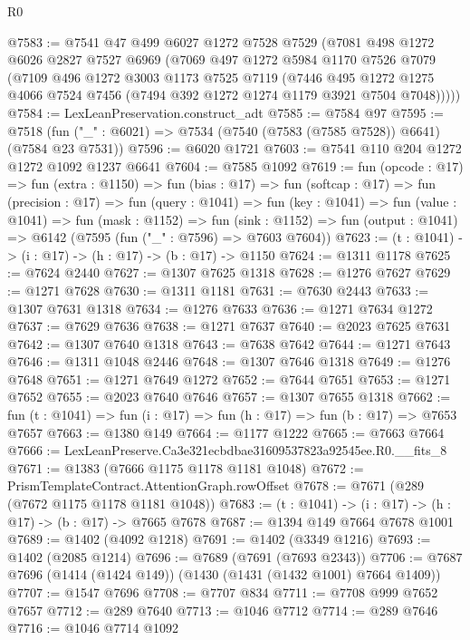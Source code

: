 \begin{lexlean}{R0}
\begin{coremodule}
@7583 := @7541
    @47
    @499
    @6027
    @1272
    @7528
    @7529
    (@7081
      @498
      @1272
      @6026
      @2827
      @7527
      @6969
      (@7069
        @497
        @1272
        @5984
        @1170
        @7526
        @7079
        (@7109
          @496
          @1272
          @3003
          @1173
          @7525
          @7119
          (@7446
            @495
            @1272
            @1275
            @4066
            @7524
            @7456
            (@7494 @392 @1272 @1274 @1179 @3921 @7504 @7048)))))
@7584 := LexLeanPreservation.construct_adt
@7585 := @7584 @97
@7595 := @7518 (fun ("_" : @6021) => @7534 (@7540 (@7583 (@7585 @7528)) @6641) (@7584 @23 @7531))
@7596 := @6020 @1721
@7603 := @7541 @110 @204 @1272 @1272 @1092 @1237 @6641
@7604 := @7585 @1092
@7619 := fun (opcode : @17) =>
  fun (extra : @1150) =>
  fun (bias : @17) =>
  fun (softcap : @17) =>
  fun (precision : @17) =>
  fun (query : @1041) =>
  fun (key : @1041) =>
  fun (value : @1041) =>
  fun (mask : @1152) =>
  fun (sink : @1152) => fun (output : @1041) => @6142 (@7595 (fun ("_" : @7596) => @7603 @7604))
@7623 := (t : @1041) -> (i : @17) -> (h : @17) -> (b : @17) -> @1150
@7624 := @1311 @1178
@7625 := @7624 @2440
@7627 := @1307 @7625 @1318
@7628 := @1276 @7627
@7629 := @1271 @7628
@7630 := @1311 @1181
@7631 := @7630 @2443
@7633 := @1307 @7631 @1318
@7634 := @1276 @7633
@7636 := @1271 @7634 @1272
@7637 := @7629 @7636
@7638 := @1271 @7637
@7640 := @2023 @7625 @7631
@7642 := @1307 @7640 @1318
@7643 := @7638 @7642
@7644 := @1271 @7643
@7646 := @1311 @1048 @2446
@7648 := @1307 @7646 @1318
@7649 := @1276 @7648
@7651 := @1271 @7649 @1272
@7652 := @7644 @7651
@7653 := @1271 @7652
@7655 := @2023 @7640 @7646
@7657 := @1307 @7655 @1318
@7662 := fun (t : @1041) => fun (i : @17) => fun (h : @17) => fun (b : @17) => @7653 @7657
@7663 := @1380 @149
@7664 := @1177 @1222
@7665 := @7663 @7664
@7666 := LexLeanPreserve.Ca3e321ecbdbae31609537823a92545ee.R0.__fits_8
@7671 := @1383 (@7666 @1175 @1178 @1181 @1048)
@7672 := PrismTemplateContract.AttentionGraph.rowOffset
@7678 := @7671 (@289 (@7672 @1175 @1178 @1181 @1048))
@7683 := (t : @1041) -> (i : @17) -> (h : @17) -> (b : @17) -> @7665 @7678
@7687 := @1394 @149 @7664 @7678 @1001
@7689 := @1402 (@4092 @1218)
@7691 := @1402 (@3349 @1216)
@7693 := @1402 (@2085 @1214)
@7696 := @7689 (@7691 (@7693 @2343))
@7706 := @7687 @7696 (@1414 (@1424 @149)) (@1430 (@1431 (@1432 @1001) @7664 @1409))
@7707 := @1547 @7696
@7708 := @7707 @834
@7711 := @7708 @999 @7652 @7657
@7712 := @289 @7640
@7713 := @1046 @7712
@7714 := @289 @7646
@7716 := @1046 @7714 @1092

\end{coremodule}
\end{lexlean}
